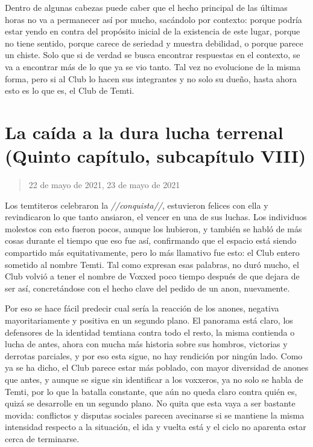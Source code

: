 \documentclass[
  spanish,
]{book}
\begin{document}
Dentro de algunas cabezas puede caber que el hecho principal de las últimas horas no va a permanecer así por mucho, sacándolo por contexto: porque podría estar yendo en contra del propósito inicial de la existencia de este lugar, porque no tiene sentido, porque carece de seriedad y muestra debilidad, o porque parece un chiste. Solo que si de verdad se busca encontrar respuestas en el contexto, se va a encontrar más de lo que ya se vio tanto.
Tal vez no evolucione de la misma forma, pero si al Club lo hacen sus integrantes y no solo su dueño, hasta ahora esto es lo que es, el Club de Temti.

\hypertarget{la-cauxedda-a-la-dura-lucha-terrenal-quinto-capuxedtulo-subcapuxedtulo-viii}{%
\section{La caída a la dura lucha terrenal (Quinto capítulo, subcapítulo VIII)}\label{la-cauxedda-a-la-dura-lucha-terrenal-quinto-capuxedtulo-subcapuxedtulo-viii}}

\begin{quote}
22 de mayo de 2021, 23 de mayo de 2021
\end{quote}

Los temtiteros celebraron la \emph{//conquista//}, estuvieron felices con ella y revindicaron lo que tanto ansiaron, el vencer en una de sus luchas.
Los individuos molestos con esto fueron pocos, aunque los hubieron, y también se habló de más cosas durante el tiempo que eso fue así, confirmando que el espacio está siendo compartido más equitativamente, pero lo más llamativo fue esto: el Club entero sometido al nombre Temti. Tal como expresan esas palabras, no duró mucho, el Club volvió a tener el nombre de Voxxed poco tiempo después de que dejara de ser así, concretándose con el hecho clave del pedido de un anon, nuevamente.

Por eso se hace fácil predecir cual sería la reacción de los anones, negativa mayoritariamente y positiva en un segundo plano. El panorama está claro, los defensores de la identidad temtiana contra todo el resto, la misma contienda o lucha de antes, ahora con mucha más historia sobre sus hombros, victorias y derrotas parciales, y por eso esta sigue, no hay rendición por ningún lado.
Como ya se ha dicho, el Club parece estar más poblado, con mayor diversidad de anones que antes, y aunque se sigue sin identificar a los voxxeros, ya no solo se habla de Temti, por lo que la batalla constante, que aún no queda claro contra quién es, quizá se desarrolle en un segundo plano. No quita que esta vaya a ser bastante movida: conflictos y disputas sociales parecen avecinarse si se mantiene la misma intensidad respecto a la situación, el ida y vuelta está y el ciclo no aparenta estar cerca de terminarse.
\end{document}

